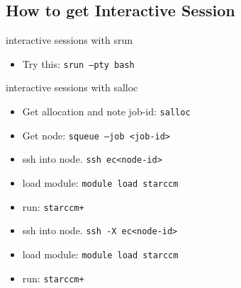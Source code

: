 \documentclass[10pt,compress]{beamer}
\begin{document}
\subsection{How to get Interactive Session}

\begin{frame}{interactive sessions with srun}
\begin{itemize} \setlength{\itemsep}{1.5em}%
  \pause
  \item Try this: \texttt{srun --pty bash}
   
\end{itemize}
\end{frame}

\begin{frame}{interactive sessions with salloc}
\begin{itemize} \setlength{\itemsep}{1.5em}%
   \item Get allocation and note job-id: \texttt{salloc}
   \pause
   \item Get node: \texttt{squeue --job <job-id>}
   \pause
   \item ssh into node. \texttt{ssh ec<node-id>}
   \pause
   \item load module: \texttt{module load starccm}
   \pause
   \item run: \texttt{starccm+}
   \pause
   \item ssh into node. \texttt{ssh -X ec<node-id>}
   \pause
   \item load module: \texttt{module load starccm}
   \pause
   \item run: \texttt{starccm+}
      
\end{itemize}
\end{frame}
\end{document}
